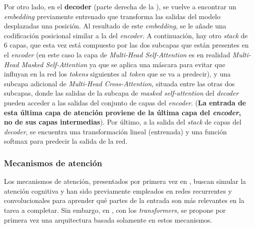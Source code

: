 \vspace{2mm}
Por otro lado, en el \textbf{decoder} (parte derecha de la ), se vuelve a encontrar un \textit{embedding} previamente entrenado que transforma las salidas del modelo desplazadas una posición. Al resultado de este \textit{embedding}, se le añade una codificación posicional similar a la del \textit{encoder}. A continuación, hay otro \textit{stack} de 6 capas, que esta vez está compuesto por las dos subcapas que están presentes en el \textit{encoder} (en este caso la capa de \textit{Multi-Head Self-Attention} es en realidad \textit{Multi-Head Masked Self-Attention} ya que se aplica una máscara para evitar que influyan en la red los \textit{tokens} siguientes al \textit{token} que se va a predecir), y una subcapa adicional de \textit{Multi-Head Cross-Attention}, situada entre las otras dos subcapas, donde las salidas de la subcapa de \textit{masked self-attention} del \textit{decoder} pueden acceder a las salidas del conjunto de capas del \textit{encoder}. (\textbf{La entrada de esta última capa de atención proviene de la última capa del \textit{encoder}, no de sus capas intermedias}). Por último, a la salida del \textit{stack} de capas del \textit{decoder}, se encuentra una transformación lineal (entrenada) y una función softmax para predecir la salida de la red.

\subsubsection{Mecanismos de atención}\label{bloques-atencion}

\vspace{2mm}
Los mecanismos de atención, presentados por primera vez en \cite{neuralmachinetranslationalignandtranslate}, buscan simular la atención cognitiva y han sido previamente empleados en redes recurrentes \cite{pmlr-v37-xuc15} y convolucionales \cite{7298685, 7410695} para aprender qué partes de la entrada son más relevantes en la tarea a completar. Sin embargo, en \cite{NIPS2017_3f5ee243}, con los \textit{transformers}, se propone por primera vez una arquitectura basada solamente en estos mecanismos. 

